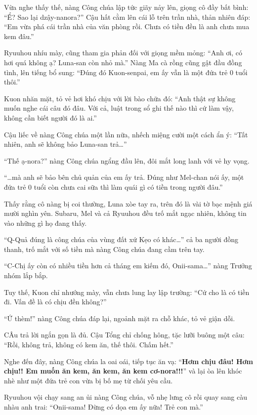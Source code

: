 \documentclass[../main.tex]{subfiles}
\begin{document}
Vừa nghe thấy thế, nàng Công chúa lập tức giãy nảy lên, giọng cô đầy bất bình: ``Ể? Sao lại dzậy-nanora?'' Cậu hất cằm lên cái lỗ trên trần nhà, thản nhiên đáp: ``Em vừa phá cái trần nhà của văn phòng rồi. Chưa có tiền đền là anh chưa mua kem đâu.''

Ryuuhou nhíu mày, cũng tham gia phản đối với giọng mềm mỏng: ``Anh ơi, có hơi quá không ạ? Luna-san còn nhỏ mà.'' Nàng Ma cà rồng cũng gật đầu đồng tình, lên tiếng bổ sung: ``Đúng đó Kuon-senpai, em ấy vẫn là một đứa trẻ 0 tuổi thôi.''

Kuon nhăn mặt, tỏ vẻ hơi khó chịu với lời bào chữa đó: ``Anh thật sự không muốn nghe cái câu đó đâu. Với cả, luật trong sổ ghi thế nào thì cứ làm vậy, không cần biết người đó là ai.''

Cậu liếc về nàng Công chúa một lần nữa, nhếch miệng cười một cách ẩn ý: ``Tất nhiên, anh sẽ không bảo Luna-san trả\dots''

``Thế ạ-nora?'' nàng Công chúa ngẩng đầu lên, đôi mắt long lanh với vẻ hy vọng.

``\dots mà anh sẽ bảo bên chủ quản của em ấy trả. Đúng như Mel-chan nói ấy, một đứa trẻ 0 tuổi còn chưa cai sữa thì làm quái gì có tiền trong người đâu.''

Thấy rằng cô nàng bị coi thường, Luna xòe tay ra, trên đó là vài tờ bạc mệnh giá mười nghìn yên. Subaru, Mel và cả Ryuuhou đều trố mắt ngạc nhiên, không tin vào những gì họ đang thấy.

``Q-Quả đúng là công chúa của vùng đất xứ Kẹo có khác\dots'' cả ba người đồng thanh, trố mắt với số tiền mà nàng Công chúa đang cầm trên tay.

``C-Chị ấy còn có nhiều tiền hơn cả tháng em kiếm đó, Onii-sama\dots'' nàng Trưởng nhóm lắp bắp.

Tuy thế, Kuon chỉ nhướng mày, vẫn chưa lung lay lập trường: ``Cứ cho là có tiền đi. Vấn đề là có chịu đền không?''

``Ứ thèm!'' nàng Công chúa đáp lại, ngoảnh mặt ra chỗ khác, tỏ vẻ giận dỗi.

CÂu trả lời ngắn gọn là đủ. Cậu Tổng chỉ chống hông, tặc lưỡi buông một câu: ``Rồi, không trả, không có kem ăn, thế thôi. Chấm hết.''

Nghe đến đây, nàng Công chúa la oai oái, tiếp tục ăn vạ: ``\textbf{Hơm chịu đâu! Hơm chịu!! Em muốn ăn kem, ăn kem, ăn kem cơ-nora!!!}'' và lại òa lên khóc nhè như một đứa trẻ con vừa bị bố mẹ từ chối yêu cầu.

Ryuuhou vội chạy sang an ủi nàng Công chúa, vỗ nhẹ lưng cô rồi quay sang càu nhàu anh trai: ``Onii-sama! Đừng có dọa em ấy nữa! Trẻ con mà.''
\end{document}
